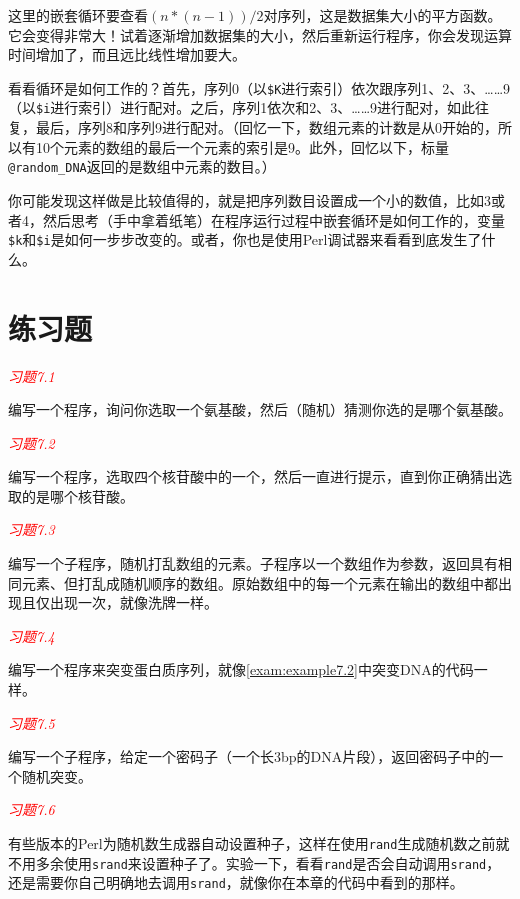 这里的嵌套循环要查看$(n * (n-1)) / 2$对序列，这是数据集大小的平方函数。它会变得非常大！试着逐渐增加数据集的大小，然后重新运行程序，你会发现运算时间增加了，而且远比线性增加要大。

看看循环是如何工作的？首先，序列0（以\verb|$K|进行索引）依次跟序列1、2、3、……9（以\verb|$i|进行索引）进行配对。之后，序列1依次和2、3、……9进行配对，如此往复，最后，序列8和序列9进行配对。（回忆一下，数组元素的计数是从0开始的，所以有10个元素的数组的最后一个元素的索引是9。此外，回忆以下，标量\verb|@random_DNA|返回的是数组中元素的数目。）

你可能发现这样做是比较值得的，就是把序列数目设置成一个小的数值，比如3或者4，然后思考（手中拿着纸笔）在程序运行过程中嵌套循环是如何工作的，变量\verb|$k|和\verb|$i|是如何一步步改变的。或者，你也是使用Perl调试器来看看到底发生了什么。

\section{练习题}
\textcolor{red}{\textit{习题7.1}}
\begin{adjustwidth}{1cm}{}
编写一个程序，询问你选取一个氨基酸，然后（随机）猜测你选的是哪个氨基酸。
\end{adjustwidth}

\textcolor{red}{\textit{习题7.2}}
\begin{adjustwidth}{1cm}{}
编写一个程序，选取四个核苷酸中的一个，然后一直进行提示，直到你正确猜出选取的是哪个核苷酸。
\end{adjustwidth}

\textcolor{red}{\textit{习题7.3}}
\begin{adjustwidth}{1cm}{}
编写一个子程序，随机打乱数组的元素。子程序以一个数组作为参数，返回具有相同元素、但打乱成随机顺序的数组。原始数组中的每一个元素在输出的数组中都出现且仅出现一次，就像洗牌一样。
\end{adjustwidth}

\textcolor{red}{\textit{习题7.4}}
\begin{adjustwidth}{1cm}{}
编写一个程序来突变蛋白质序列，就像\autoref{exam:example7.2}中突变DNA的代码一样。
\end{adjustwidth}

\textcolor{red}{\textit{习题7.5}}
\begin{adjustwidth}{1cm}{}
编写一个子程序，给定一个密码子（一个长3bp的DNA片段），返回密码子中的一个随机突变。
\end{adjustwidth}

\textcolor{red}{\textit{习题7.6}}
\begin{adjustwidth}{1cm}{}
有些版本的Perl为随机数生成器自动设置种子，这样在使用\verb|rand|生成随机数之前就不用多余使用\verb|srand|来设置种子了。实验一下，看看\verb|rand|是否会自动调用\verb|srand|，还是需要你自己明确地去调用\verb|srand|，就像你在本章的代码中看到的那样。
\end{adjustwidth}

